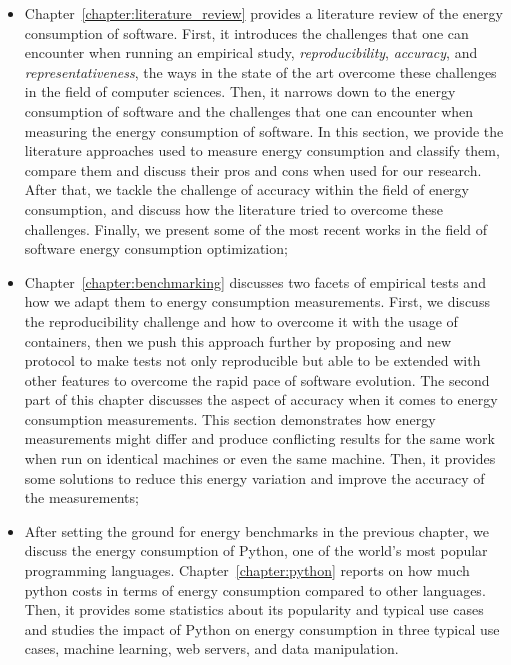 \begin{itemize}
    \item Chapter~\ref{chapter:literature_review} provides a literature review of the energy consumption of software.
          First, it introduces the challenges that one can encounter when running an empirical study, \emph{reproducibility}, \emph{accuracy}, and \emph{representativeness}, the ways in the state of the art overcome these challenges in the field of computer sciences.
          Then, it narrows down to the energy consumption of software and the challenges that one can encounter when measuring the energy consumption of software.
          In this section, we provide the literature approaches used to measure energy consumption and classify them, compare them and discuss their pros and cons when used for our research. After that, we tackle the challenge of accuracy within the field of energy consumption, and discuss how the literature tried to overcome these challenges. Finally, we  present some of the most recent works in the field of software energy consumption optimization;
    \item Chapter~\ref{chapter:benchmarking} discusses two facets of empirical tests and how we adapt them to energy consumption measurements.
          First, we discuss the reproducibility challenge and how to overcome it with the usage of containers, then we push this approach further by proposing and new protocol to make tests not only reproducible but able to be extended with other features to overcome the rapid pace of software evolution.
          The second part of this chapter discusses the aspect of accuracy when it comes to energy consumption measurements.
          This section demonstrates how energy measurements might differ and produce conflicting results for the same work when run on identical machines or even the same machine.
          Then, it provides some solutions to reduce this energy variation and improve the accuracy of the measurements;
    \item After setting the ground for energy benchmarks in the previous chapter, we discuss the energy consumption of Python, one of the world's most popular programming languages.
          Chapter~\ref{chapter:python} reports on how much python costs in terms of energy consumption compared to other languages.
          Then, it provides some statistics about its popularity and typical use cases and studies the impact of Python on energy consumption in three typical use cases, machine learning, web servers, and data manipulation.

\end{itemize}
